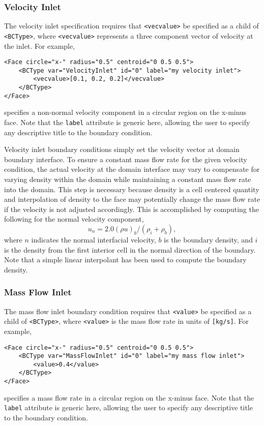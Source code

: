 \subsubsection*{Velocity Inlet}
%
The velocity inlet specification requires that \verb=<vecvalue>= be specified as a child of \verb=<BCType>=, where \verb=<vecvalue>= represents a three component vector of velocity at the inlet. For example, 
%
\begin{Verbatim}[fontsize=\footnotesize]
<Face circle="x-" radius="0.5" centroid="0 0.5 0.5">
	<BCType var="VelocityInlet" id="0" label="my velocity inlet">
		<vecvalue>[0.1, 0.2, 0.2]</vecvalue>
	</BCType>
</Face>
\end{Verbatim}
%
specifies a non-normal velocity component in a circular region on the x-minus face.  Note that the \verb=label= attribute is generic here, allowing the user to specify any descriptive title to the boundary condition.  

Velocity inlet boundary conditions simply set the velocity vector at domain boundary interface.  To ensure a constant mass flow rate for the given velocity condition, the actual velocity at the domain interface may vary to compensate for varying density within the domain while maintaining a constant mass flow rate into the domain.  This step is necessary because density is a cell centered quantity and interpolation of density to the face may potentially change the mass flow rate if the velocity is not adjusted accordingly.  This is accomplished by computing the following for the normal velocity component, 
%
\begin{equation}
u_{n} = 2.0( \rho u )_{b} / (\rho_{i} + \rho_{b}), 
\end{equation}
% 
where $n$ indicates the normal interfacial velocity, $b$ is the boundary density, and $i$ is the density from the first interior cell in the normal direction of the boundary.  Note that a simple linear interpolant has been used to compute the boundary density.  

\subsubsection*{Mass Flow Inlet}
%
The mass flow inlet boundary condition requires that \verb=<value>= be specified as a child of \verb=<BCType>=, where \verb=<value>= is the mass flow rate in units of \verb=[kg/s]=. For example, 
%
\begin{Verbatim}[fontsize=\footnotesize]
<Face circle="x-" radius="0.5" centroid="0 0.5 0.5">
	<BCType var="MassFlowInlet" id="0" label="my mass flow inlet">
		<value>0.4</value>
	</BCType>
</Face>
\end{Verbatim}
%
specifies a mass flow rate in a circular region on the x-minus face.  Note that the \verb=label= attribute is generic here, allowing the user to specify any descriptive title to the boundary condition.  

